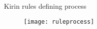 \begin{frame}{Kirin rules defining process}

\begin{figure}
  \centering
  \texttt{[image: ruleprocess]}
\end{figure}

\end{frame}